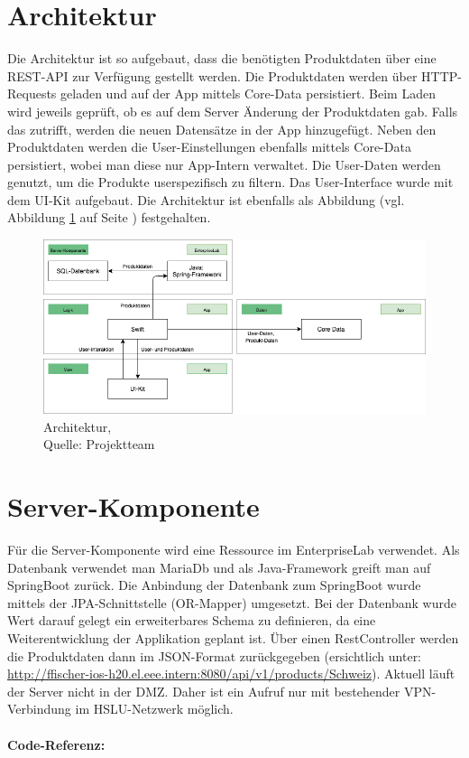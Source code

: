 \documentclass[12pt,titlepage]{article}
\begin{document}
\section*{Architektur}
Die Architektur ist so aufgebaut, dass die benötigten Produktdaten über eine REST-API zur Verfügung gestellt werden. Die Produktdaten werden über HTTP-Requests geladen und auf der App mittels Core-Data persistiert. Beim Laden wird jeweils geprüft, ob es auf dem Server Änderung der Produktdaten gab. Falls das zutrifft, werden die neuen Datensätze in der App hinzugefügt. Neben den Produktdaten werden die User-Einstellungen ebenfalls mittels Core-Data persistiert, wobei man diese nur App-Intern verwaltet. Die User-Daten werden genutzt, um die Produkte userspezifisch zu filtern. Das User-Interface wurde mit dem UI-Kit aufgebaut. Die Architektur ist ebenfalls als Abbildung (vgl. Abbildung \ref{img: Architektur} auf Seite \pageref{img: Architektur}) festgehalten.\\
\begin{figure}[H]
	\centering
	\includegraphics[width=16cm]{Img/Architektur2.png}
	\caption[Architektur]{Architektur,\\ Quelle: Projektteam}
	\label{img: Architektur}
\end{figure}

\section*{Server-Komponente}
Für die Server-Komponente wird eine Ressource im EnterpriseLab verwendet. Als Datenbank verwendet man MariaDb und als Java-Framework greift man auf SpringBoot zurück. Die Anbindung der Datenbank zum SpringBoot wurde mittels der JPA-Schnittstelle (OR-Mapper) umgesetzt. Bei der Datenbank wurde Wert darauf gelegt ein erweiterbares Schema zu definieren, da eine Weiterentwicklung der Applikation geplant ist. Über einen RestController werden die Produktdaten dann im JSON-Format zurückgegeben (ersichtlich unter: \url{http://ffischer-ios-h20.el.eee.intern:8080/api/v1/products/Schweiz}). Aktuell läuft der Server nicht in der DMZ. Daher ist ein Aufruf nur mit bestehender VPN-Verbindung im HSLU-Netzwerk möglich.\\
\\
\textbf{Code-Referenz: }
\end{document}

